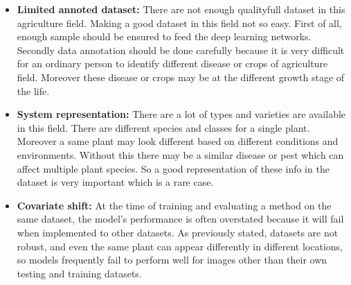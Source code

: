 \begin{itemize}
    \item \textbf{Limited annoted dataset:} There are not enough qualityfull dataset in this agriculture field. Making a good dataset in this field not so easy. First of all, enough sample should be ensured to feed the deep learning networks. Secondly data annotation should be done carefully because it is very difficult for an ordinary person to identify different disease or crops of agriculture field. Moreover these disease or crops may be at the different growth stage of the life.
    
    \item \textbf{System representation:} There are a lot of types and varieties are available in this field. There are different species and classes for a single plant. Moreover a same plant may look different based on different conditions and environments. Without this there may be a similar disease or pest which can affect multiple plant species. So a good representation of these info in the dataset is very important which is a rare case.
    
    \item \textbf{Covariate shift:} At the time of training and evaluating a method on the same dataset, the model's performance is often overstated because it will fail when implemented to other datasets. As previously stated, datasets are not robust, and even the same plant can appear differently in different locations, so models frequently fail to perform well for images other than their own testing and training datasets.


\end{itemize}
